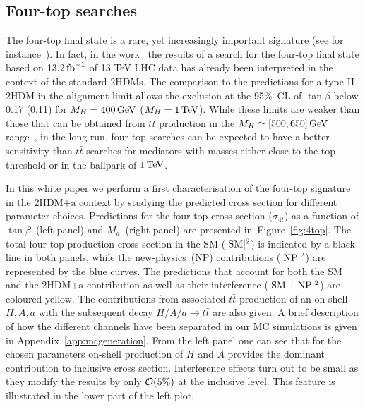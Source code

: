 \documentclass[a4paper, 11pt,notoc]{article}
\newcommand{\ma}{\ensuremath{M_{a}}\xspace}
\newcommand{\mH}{\ensuremath{M_{H}}\xspace}
\newcommand{\hdma}{\ensuremath{\textrm{2HDM+a}}\xspace}
\begin{document}
\subsection{Four-top searches}
\label{sec:fourtopmain}

The four-top final state is a rare, yet increasingly important signature (see for instance~\cite{ATLAS-CONF-2016-104,Sirunyan:2017roi,Aaboud:2018xuw,Hajer:2015gka,Gori:2016zto,Alvarez:2016nrz}).   In fact, in the work~\cite{ATLAS-CONF-2016-104} the results of a search for the four-top final state based on $13.2 \, {\rm fb}^{-1}$ of 13 TeV LHC data has already been interpreted in the context of the standard 2HDMs. The comparison to the predictions for a type-II 2HDM in the alignment limit allows the exclusion at the 95\%~CL of $\tan \beta$  below 0.17 (0.11) for $\mH = 400 \, {\rm GeV}$ ($\mH = 1 \, {\rm TeV}$). While these limits are weaker than those that can be obtained from $t \bar t$ production in the $M_{H} \simeq [500, 650] \, {\rm GeV}$ range~\cite{Aaboud:2017hnm}, in the long run, four-top searches can be expected to have a better sensitivity than $t \bar t$ searches for mediators with  masses either close to the top threshold or  in the ballpark of $1 \, {\rm TeV}$. 

 In this white paper we perform a first characterisation of the four-top signature in the \hdma context by studying the predicted cross section for different parameter choices. Predictions for the four-top cross section ($\sigma_{4t}$) as a function of $\tan \beta$~(left panel) and $\ma$~(right panel) are presented in~Figure~\ref{fig:4top}. The total four-top production cross section in the SM ($|{\rm SM}|^2$) is indicated by a black line in both panels, while the new-physics~(NP) contributions ($|{\rm NP}|^2$) are represented by the blue curves. The predictions that account for both the SM and the \hdma contribution as well as  their interference ($|{\rm SM} + {\rm NP}|^2$) are coloured yellow. The contributions from associated $t \bar t$ production of an on-shell $H, A, a$ with the subsequent decay $H/A/a \to t \bar t$ are also given.  A brief description of how the different channels have been separated in our MC simulations  is given in Appendix~\ref{app:mcgeneration}. From the left panel one can see that for the chosen parameters on-shell production of $H$ and $A$ provides the dominant contribution to inclusive cross section. Interference effects turn out to be small as they modify the results  by only ${\cal O} (5\%)$ at the inclusive level. This feature is illustrated in the lower part of the left plot.
 
\end{document}
